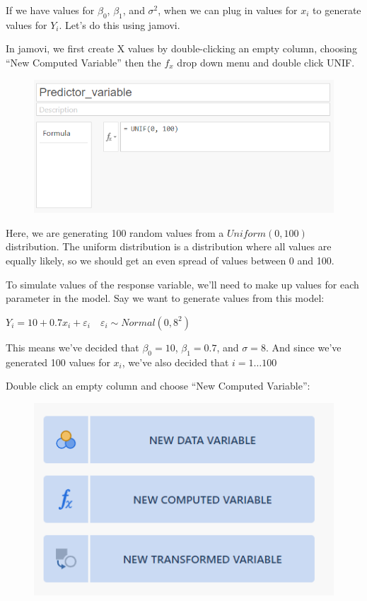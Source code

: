 \documentclass[
  letterpaper,
  DIV=11,
  numbers=noendperiod]{scrreprt}
\begin{document}
If we have values for \(\beta_0\), \(\beta_1\), and \(\sigma^2\), when
we can plug in values for \(x_i\) to generate values for \(Y_i\). Let's
do this using jamovi.

In jamovi, we first create X values by double-clicking an empty column,
choosing ``New Computed Variable'' then the \(f_x\) drop down menu and
double click UNIF.

\begin{figure}

{\centering \includegraphics{images/mod2_pt1 (7).png}

}

\end{figure}

Here, we are generating 100 random values from a \(Uniform(0,100)\)
distribution. The uniform distribution is a distribution where all
values are equally likely, so we should get an even spread of values
between 0 and 100.

To simulate values of the response variable, we'll need to make up
values for each parameter in the model. Say we want to generate values
from this model:

\(Y_i=10+0.7x_i+\varepsilon_i \quad \varepsilon_i \sim Normal(0,8^2)\)

This means we've decided that \(\beta_0=10\), \(\beta_1=0.7\), and
\(\sigma=8\). And since we've generated 100 values for \(x_i\), we've
also decided that \(i=1\dots 100\)

Double click an empty column and choose ``New Computed Variable'':

\begin{figure}

{\centering \includegraphics{images/mod2_pt1 (10).png}

}

\end{figure}
\end{document}
